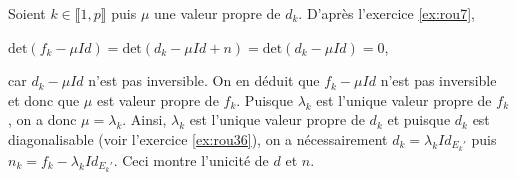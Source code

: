 {{Soient $k\in\llbracket1,p\rrbracket$ puis $\mu$ une valeur propre de $d_k$. D'après l'exercice \ref{ex:rou7},

\begin{center}
$\text{det}(f_k-\mu Id)=\text{det}(d_k-\mu Id+n)=\text{det}(d_k-\mu Id)=0$,
\end{center}

car $d_k-\mu Id$ n'est pas inversible. On en déduit que $f_k-\mu Id$ n'est pas inversible et donc que $\mu$ est valeur propre de $f_k$. Puisque $\lambda_k$ est l'unique valeur propre de $f_k$, on a donc $\mu=\lambda_k$. Ainsi, $\lambda_k$ est l'unique valeur propre de $d_k$ et puisque $d_k$ est diagonalisable (voir l'exercice \ref{ex:rou36}), on a nécessairement $d_k=\lambda_kId_{E_k'}$ puis $n_k=f_k-\lambda_k Id_{E_k'}$. Ceci montre l'unicité de $d$ et $n$.
}
}
